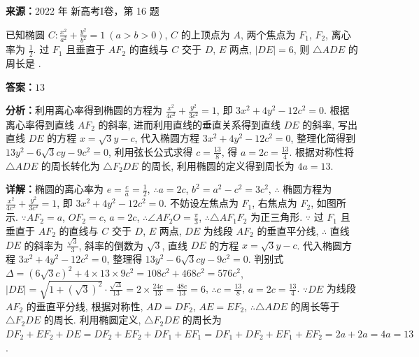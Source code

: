 \begin{question}[points=5]
\textbf{来源：}2022 年 新高考I卷，第 16 题\par
已知椭圆 $C: \frac{x^2}{a^2} + \frac{y^2}{b^2} = 1\ (a > b > 0)$, $C$ 的上顶点为 $A$, 两个焦点为 $F_1$, $F_2$, 离心率为 $\frac{1}{2}$. 过 $F_1$ 且垂直于 $AF_2$ 的直线与 $C$ 交于 $D$, $E$ 两点, $|DE| = 6$, 则 $\triangle ADE$ 的周长是 .
\fillin[{$13$}]
\begin{solution}
\textbf{答案：}$13$

\textbf{分析：}利用离心率得到椭圆的方程为 $\frac{x^2}{4c^2} + \frac{y^2}{3c^2} = 1$, 即 $3x^2 + 4y^2 - 12c^2 = 0$. 根据离心率得到直线 $AF_2$ 的斜率, 进而利用直线的垂直关系得到直线 $DE$ 的斜率, 写出直线 $DE$ 的方程 $x = \sqrt{3}y - c$, 代入椭圆方程 $3x^2 + 4y^2 - 12c^2 = 0$, 整理化简得到 $13y^2 - 6\sqrt{3}cy - 9c^2 = 0$, 利用弦长公式求得 $c = \frac{13}{8}$, 得 $a = 2c = \frac{13}{4}$. 根据对称性将 $\triangle ADE$ 的周长转化为 $\triangle F_2DE$ 的周长, 利用椭圆的定义得到周长为 $4a = 13$.

\textbf{详解：}椭圆的离心率为 $e = \frac{c}{a} = \frac{1}{2}$, $\therefore a = 2c$, $b^2 = a^2 - c^2 = 3c^2$, $\therefore$ 椭圆方程为 $\frac{x^2}{4c^2} + \frac{y^2}{3c^2} = 1$, 即 $3x^2 + 4y^2 - 12c^2 = 0$. 不妨设左焦点为 $F_1$, 右焦点为 $F_2$, 如图所示. $\because AF_2 = a$, $OF_2 = c$, $a = 2c$, $\therefore \angle AF_2O = \frac{\pi}{3}$, $\therefore \triangle AF_1F_2$ 为正三角形. $\because$ 过 $F_1$ 且垂直于 $AF_2$ 的直线与 $C$ 交于 $D$, $E$ 两点, $DE$ 为线段 $AF_2$ 的垂直平分线, $\therefore$ 直线 $DE$ 的斜率为 $\frac{\sqrt{3}}{3}$, 斜率的倒数为 $\sqrt{3}$, 直线 $DE$ 的方程 $x = \sqrt{3}y - c$. 代入椭圆方程 $3x^2 + 4y^2 - 12c^2 = 0$, 整理得 $13y^2 - 6\sqrt{3}cy - 9c^2 = 0$. 判别式 $\Delta = (6\sqrt{3}c)^2 + 4 \times 13 \times 9c^2 = 108c^2 + 468c^2 = 576c^2$, $|DE| = \sqrt{1 + (\sqrt{3})^2} \cdot \frac{\sqrt{\Delta}}{13} = 2 \times \frac{24c}{13} = \frac{48c}{13} = 6$, $\therefore c = \frac{13}{8}$, $a = 2c = \frac{13}{4}$. $\because DE$ 为线段 $AF_2$ 的垂直平分线, 根据对称性, $AD = DF_2$, $AE = EF_2$, $\therefore \triangle ADE$ 的周长等于 $\triangle F_2DE$ 的周长. 利用椭圆定义, $\triangle F_2DE$ 的周长为 $DF_2 + EF_2 + DE = DF_2 + EF_2 + DF_1 + EF_1 = DF_1 + DF_2 + EF_1 + EF_2 = 2a + 2a = 4a = 13$.
\end{solution}
\end{question}

